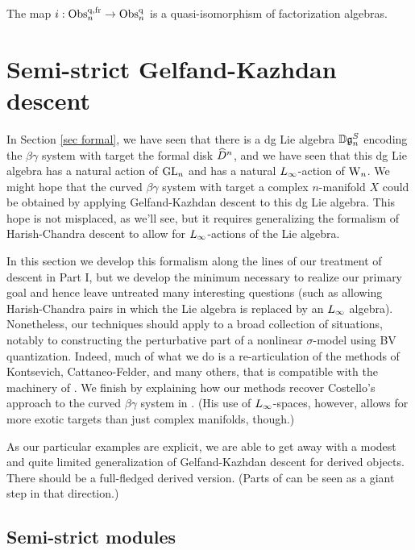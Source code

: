 \begin{prop}
\label{equiv of noneq}
The map $i: {\rm Obs}^{{\rm q},{\rm fr}}_n \to {\rm Obs}^{{\rm q}}_n$ is a quasi-isomorphism of factorization algebras.
\end{prop}

\section{Semi-strict Gelfand-Kazhdan descent}
\label{sec ss GK descent}

In Section \ref{sec formal}, we have seen that there is a dg Lie algebra $\mathbb D \mathfrak{g}_n^S$ 
encoding the $\beta\gamma$ system with target the formal disk $\widehat{D}^n$, 
and we have seen that this dg Lie algebra has a natural action of ${\rm GL}_n$ and has a natural $\L8$-action of ${{\rm W}_n}$. 
We might hope that the curved $\beta\gamma$ system with target a complex $n$-manifold $X$ could be obtained 
by applying Gelfand-Kazhdan descent to this dg Lie algebra.
This hope is not misplaced, as we'll see, 
but it requires generalizing the formalism of Harish-Chandra descent to allow for $\L8$-actions of the Lie algebra.

In this section we develop this formalism along the lines of our treatment of descent in Part I,
but we develop the minimum necessary to realize our primary goal and hence leave untreated many interesting questions
(such as allowing Harish-Chandra pairs in which the Lie algebra is replaced by an $\L8$ algebra).
Nonetheless, our techniques should apply to a broad collection of situations, 
notably to constructing the perturbative part of a nonlinear $\sigma$-model using BV quantization.
Indeed, much of what we do is a re-articulation of the methods of Kontsevich, Cattaneo-Felder, and many others, 
that is compatible with the machinery of \cite{CG}.
We finish by explaining how our methods recover Costello's approach to the curved $\beta\gamma$ system in \cite{WG2}.
(His use of $\L8$-spaces, however, allows for more exotic targets than just complex manifolds, though.)

\begin{rmk}
As our particular examples are explicit, we are able to get away with 
a modest and quite limited generalization of Gelfand-Kazhdan descent for derived objects.
There should be a full-fledged derived version. 
(Parts of \cite{CPTVV} can be seen as a giant step in that direction.)
\end{rmk}

\subsection{Semi-strict modules}

